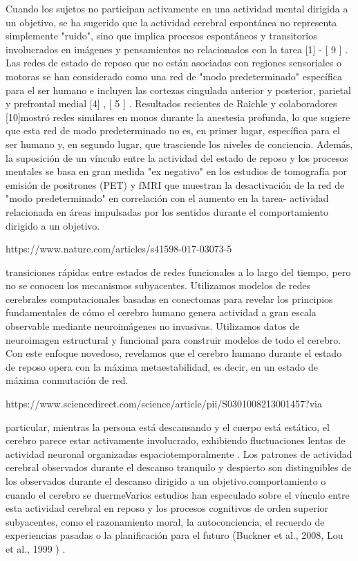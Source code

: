 Cuando los sujetos no participan activamente en una actividad mental dirigida a un objetivo, se ha sugerido que la actividad cerebral espontánea no representa simplemente "ruido", sino que implica procesos espontáneos y transitorios involucrados en imágenes y pensamientos no relacionados con la tarea [1] - [ 9 ] . Las redes de estado de reposo que no están asociadas con regiones sensoriales o motoras se han considerado como una red de "modo predeterminado" específica para el ser humano e incluyen las cortezas cingulada anterior y posterior, parietal y prefrontal medial [4] , [ 5 ] . Resultados recientes de Raichle y colaboradores [10]mostró redes similares en monos durante la anestesia profunda, lo que sugiere que esta red de modo predeterminado no es, en primer lugar, específica para el ser humano y, en segundo lugar, que trasciende los niveles de conciencia. Además, la suposición de un vínculo entre la actividad del estado de reposo y los procesos mentales se basa en gran medida "ex negativo" en los estudios de tomografía por emisión de positrones (PET) y fMRI que muestran la desactivación de la red de "modo predeterminado" en correlación con el aumento en la tarea- actividad relacionada en áreas impulsadas por los sentidos durante el comportamiento dirigido a un objetivo. 

https://www.nature.com/articles/s41598-017-03073-5

transiciones rápidas entre estados de redes funcionales a lo largo del tiempo, pero no se conocen los mecanismos subyacentes. Utilizamos modelos de redes cerebrales computacionales basadas en conectomas para revelar los principios fundamentales de cómo el cerebro humano genera actividad a gran escala observable mediante neuroimágenes no invasivas. Utilizamos datos de neuroimagen estructural y funcional para construir modelos de todo el cerebro. Con este enfoque novedoso, revelamos que el cerebro humano durante el estado de reposo opera con la máxima metaestabilidad, es decir, en un estado de máxima conmutación de red. 

https://www.sciencedirect.com/science/article/pii/S0301008213001457?via%


particular, mientras la persona está descansando y el cuerpo está estático, el cerebro parece estar activamente involucrado, exhibiendo fluctuaciones lentas de actividad neuronal organizadas espaciotemporalmente . Los patrones de actividad cerebral observados durante el descanso tranquilo y despierto son distinguibles de los observados durante el descanso dirigido a un objetivo.comportamiento o cuando el cerebro se duermeVarios estudios han especulado sobre el vínculo entre esta actividad cerebral en reposo y los procesos cognitivos de orden superior subyacentes, como el razonamiento moral, la autoconciencia, el recuerdo de experiencias pasadas o la planificación para el futuro (Buckner et al., 2008, Lou et al., 1999 ) . 



